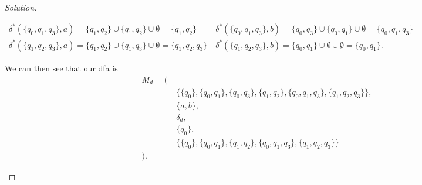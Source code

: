 \documentclass[ 12pt ]{article}
\begin{document}
\begin{enumerate}
\begin{proof}[Solution]
\begin{enumerate}
					\begin{center}
					\begin{tabularx}{1\textwidth}{
						>{\raggedright\arraybackslash}X
						>{\raggedright\arraybackslash}X }
						$\delta^* \left( \{ q_0, q_1, q_3 \}, a \right) = \{ q_1, q_2 \} \cup \{ q_1, q_2 \} \cup \emptyset = \{ q_1, q_2 \}$ & $\delta^* \left( \{ q_0, q_1, q_3 \}, b \right) = \{ q_0, q_3 \} \cup \{ q_0, q_1 \} \cup \emptyset = \{ q_0, q_1, q_3 \}$ \\
						$\delta^* \left( \{ q_1, q_2, q_3 \}, a \right) = \{ q_1, q_2 \} \cup \{ q_1, q_3 \} \cup \emptyset = \{ q_1, q_2, q_3 \}$ & $\delta^* \left( \{ q_1, q_2, q_3 \}, b \right) = \{ q_0, q_1 \} \cup \emptyset \cup \emptyset = \{ q_0, q_1 \}$.
					\end{tabularx}
					\end{center}
					We can then see that our dfa is
					\begin{align*}
						M_d = (\;& \\
						&\{ \{q_0\}, \{q_0, q_1\}, \{q_0, q_3\}, \{q_1, q_2\}, \{q_0, q_1, q_3\}, \{q_1, q_2, q_3\} \}, \\
						&\{ a, b \}, \\
						&\delta_d, \\
						&\{ q_0 \}, \\
						&\{ \{q_0\}, \{q_0, q_1\}, \{q_1, q_2\}, \{q_0, q_1, q_3\}, \{q_1, q_2, q_3\} \} \\
						).\;&
					\end{align*}
			\end{enumerate}
		\end{proof}
\end{enumerate}
\end{document}
